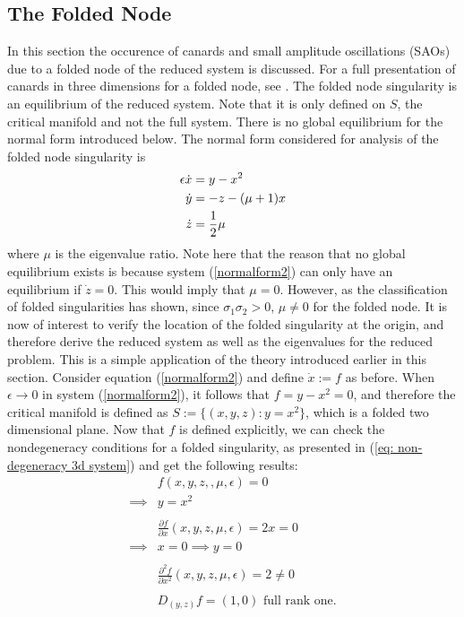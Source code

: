 \subsection{The Folded Node}
In this section the occurence of canards and small amplitude oscillations (SAOs) due to a folded node of the reduced system is discussed. For a full presentation of canards in three dimensions for a folded node, see \citet{wechselberger2005}.
The folded node singularity is an equilibrium of the reduced system. Note that it is only defined on $S$, the critical manifold and not the full system. There is no global equilibrium for the normal form introduced below.
The normal form considered for analysis of the folded node singularity is
\begin{align}\label{normalform2}
\epsilon \dot{x} &= y - x^2\\ \notag
\dot{y} &=- z -(\mu +1)x \\
\dot{z} &= \frac{1}{2} \mu \notag
\end{align}
where $\mu$ is the eigenvalue ratio. Note here that the reason that no global equilibrium exists is because system (\ref{normalform2}) can only have an equilibrium if $\dot{z} =0$. This would imply that $\mu=0$. However, as the classification of folded singularities has shown, since $\sigma_1 \sigma_2 >0$,  $\mu \neq 0$ for the folded node.
It is now of interest to verify the location of the folded singularity at the origin, and therefore derive the reduced system as well as the eigenvalues for the reduced problem.
This is a simple application of the theory introduced earlier in this section.
Consider equation (\ref{normalform2}) and define $\dot{x}:=f$ as before. When $\epsilon \to 0$ in system (\ref{normalform2}), it follows that $f= y-x^2 =0$, and therefore the critical manifold is defined as $S:= \{ (x,y,z) : y=x^2\}$, which is a folded two dimensional plane.
Now that $f$ is defined explicitly, we can check the nondegeneracy conditions for a folded singularity, as presented in (\ref{eq: non-degeneracy 3d system}) and get the following results:
\begin{align*}
&f(x,y,z,,\mu, \epsilon) = 0\\
\implies& y=x^2\\
\\
&\frac{\partial f}{\partial x} (x,y,z,\mu,\epsilon) = 2x = 0\\
\implies &x=0 \implies y=0 \\
\\
&\frac{\partial^2 f}{\partial x^2}(x,y,z,\mu,\epsilon)  = 2 \neq 0\\
\\
&D_{(y,z)}f= (1,0) \textrm{ full rank one}.
\end{align*}
